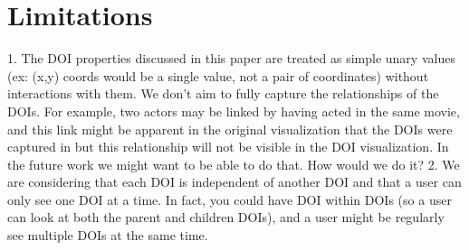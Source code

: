 \section{Limitations}
1.	The DOI properties discussed in this paper are treated as simple unary values (ex: (x,y) coords would be a single value, not a pair of coordinates) without interactions with them. We don't aim to fully capture the relationships of the DOIs. For example, two actors may be linked by having acted in the same movie, and this link might be apparent in the original visualization that the DOIs were captured in but this relationship will not be visible in the DOI visualization. In the future work we might want to be able to do that. How would we do it?
2.	We are considering that each DOI is independent of another DOI and that a user can only see one DOI at a time. In fact, you could have DOI within DOIs (so a user can look at both the parent and children DOIs), and a user might be regularly see multiple DOIs at the same time. 


